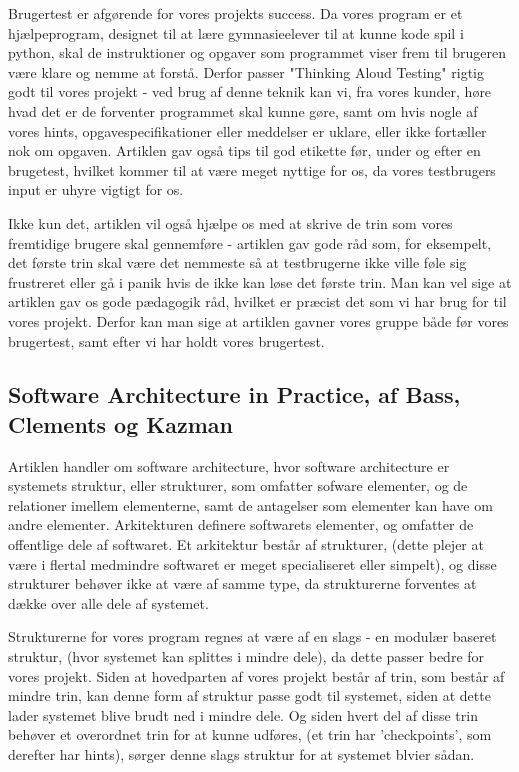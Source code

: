 \documentclass[10pt,a4paper,danish]{article}
\begin{document}
Brugertest er afgørende for vores projekts success. Da vores program er et hjælpeprogram, designet til at lære gymnasieelever til at kunne kode spil i python, skal de instruktioner og opgaver som programmet viser frem til brugeren være klare og nemme at forstå. Derfor passer "Thinking Aloud Testing" rigtig godt til vores projekt - ved brug af denne teknik kan vi, fra vores kunder, høre hvad det er de forventer programmet skal kunne gøre, samt om hvis nogle af vores hints, opgavespecifikationer eller meddelser er uklare, eller ikke fortæller nok om opgaven. Artiklen gav også tips til god etikette før, under og efter en brugetest, hvilket kommer til at være meget nyttige for os, da vores testbrugers input er uhyre vigtigt for os.

Ikke kun det, artiklen vil også hjælpe os med at skrive de trin som vores fremtidige brugere skal gennemføre - artiklen gav gode råd som, for eksempelt, det første trin skal være det nemmeste så at testbrugerne ikke ville føle sig frustreret eller gå i panik hvis de ikke kan løse det første trin. Man kan vel sige at artiklen gav os gode pædagogik råd, hvilket er præcist det som vi har brug for til vores projekt. Derfor kan man sige at artiklen gavner vores gruppe både før vores brugertest, samt efter vi har holdt vores brugertest.

\subsection{Software Architecture in Practice, af Bass, Clements og Kazman}
Artiklen handler om software architecture, hvor software architecture er systemets struktur, eller strukturer, som omfatter sofware elementer, og de relationer imellem elementerne, samt de antagelser som elementer kan have om andre elementer. Arkitekturen definere softwarets elementer, og omfatter de offentlige dele af softwaret. Et arkitektur består af strukturer, (dette plejer at være i flertal medmindre softwaret er meget specialiseret eller simpelt), og disse strukturer behøver ikke at være af samme type, da strukturerne forventes at dække over alle dele af systemet.

Strukturerne for vores program regnes at være af en slags - en modulær baseret struktur, (hvor systemet kan splittes i mindre dele), da dette passer bedre for vores projekt. Siden at hovedparten af vores projekt består af trin, som består af mindre trin, kan denne form af struktur passe godt til systemet, siden at dette lader systemet blive brudt ned i mindre dele. Og siden hvert del af disse trin behøver et overordnet trin for at kunne udføres, (et trin har 'checkpoints', som derefter har hints), sørger denne slags struktur for at systemet blvier sådan.
\end{document}
